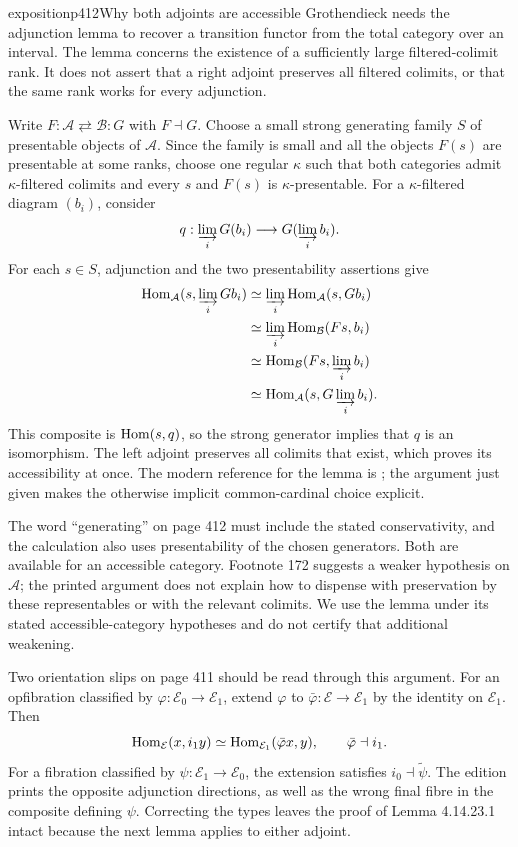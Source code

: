 \begin{dcomment}{exposition}{p412}{Why both adjoints are accessible}
Grothendieck needs the adjunction lemma to recover a transition functor from the total category over an interval. The lemma concerns the existence of a sufficiently large filtered-colimit rank. It does not assert that a right adjoint preserves all filtered colimits, or that the same rank works for every adjunction.

Write $F:\mathcal A\rightleftarrows\mathcal B:G$ with $F\dashv G$. Choose a small strong generating family $S$ of presentable objects of $\mathcal A$. Since the family is small and all the objects $F(s)$ are presentable at some ranks, choose one regular $\kappa$ such that both categories admit $\kappa$-filtered colimits and every $s$ and $F(s)$ is $\kappa$-presentable. For a $\kappa$-filtered diagram $(b_i)$, consider
\[
 q:\varinjlim_iG(b_i)\longrightarrow G(\varinjlim_i b_i).
\]
For each $s\in S$, adjunction and the two presentability assertions give
\[
\begin{aligned}
 \operatorname{Hom}_{\mathcal A}(s,\varinjlim_iG b_i)
 &\simeq\varinjlim_i\operatorname{Hom}_{\mathcal A}(s,G b_i)\\
 &\simeq\varinjlim_i\operatorname{Hom}_{\mathcal B}(F s,b_i)\\
 &\simeq\operatorname{Hom}_{\mathcal B}(F s,\varinjlim_i b_i)\\
 &\simeq\operatorname{Hom}_{\mathcal A}(s,G\varinjlim_i b_i).
\end{aligned}
\]
This composite is $\operatorname{Hom}(s,q)$, so the strong generator implies that $q$ is an isomorphism. The left adjoint preserves all colimits that exist, which proves its accessibility at once. The modern reference for the lemma is \citet[Proposition 2.23]{AdamekRosicky1994}; the argument just given makes the otherwise implicit common-cardinal choice explicit.

The word ``generating'' on page 412 must include the stated conservativity, and the calculation also uses presentability of the chosen generators. Both are available for an accessible category. Footnote 172 suggests a weaker hypothesis on $\mathcal A$; the printed argument does not explain how to dispense with preservation by these representables or with the relevant colimits. We use the lemma under its stated accessible-category hypotheses and do not certify that additional weakening.

Two orientation slips on page 411 should be read through this argument. For an opfibration classified by $\varphi:\mathcal E_0\to\mathcal E_1$, extend $\varphi$ to $\bar\varphi:\mathcal E\to\mathcal E_1$ by the identity on $\mathcal E_1$. Then
\[
 \operatorname{Hom}_{\mathcal E}(x,i_1y)
 \simeq\operatorname{Hom}_{\mathcal E_1}(\bar\varphi x,y),
 \qquad\bar\varphi\dashv i_1.
\]
For a fibration classified by $\psi:\mathcal E_1\to\mathcal E_0$, the extension satisfies $i_0\dashv\widetilde\psi$. The edition prints the opposite adjunction directions, as well as the wrong final fibre in the composite defining $\psi$. Correcting the types leaves the proof of Lemma 4.14.23.1 intact because the next lemma applies to either adjoint.
\end{dcomment}


